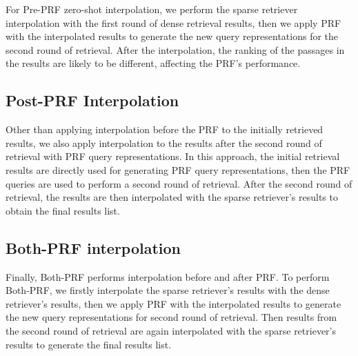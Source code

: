 For Pre-PRF zero-shot interpolation, we perform the sparse retriever interpolation with the first round of dense retrieval results, then we apply PRF with the interpolated results to generate the new query representations for the second round of retrieval. After the interpolation, the ranking of the passages in the results are likely to be different, affecting the PRF's performance. 

\subsection{Post-PRF Interpolation}

Other than applying interpolation before the PRF to the initially retrieved results, we also apply interpolation to the results after the second round of retrieval with PRF query representations. In this approach, the initial retrieval results are directly used for generating PRF query representations, then the PRF queries are used to perform a second round of retrieval. After the second round of retrieval, the results are then interpolated with the sparse retriever's results to obtain the final results list. 

\subsection{Both-PRF interpolation}
Finally, Both-PRF performs interpolation before and after PRF. To perform Both-PRF, we firstly interpolate the sparse retriever's results with the dense retriever's results, then we apply PRF with the interpolated results to generate the new query representations for second round of retrieval. Then results from the second round of retrieval are again interpolated with the sparse retriever's results to generate the final results list.